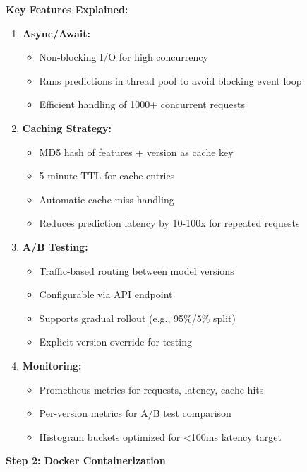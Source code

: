\textbf{Key Features Explained:}

\begin{enumerate}
    \item \textbf{Async/Await:}
    \begin{itemize}
        \item Non-blocking I/O for high concurrency
        \item Runs predictions in thread pool to avoid blocking event loop
        \item Efficient handling of 1000+ concurrent requests
    \end{itemize}

    \item \textbf{Caching Strategy:}
    \begin{itemize}
        \item MD5 hash of features + version as cache key
        \item 5-minute TTL for cache entries
        \item Automatic cache miss handling
        \item Reduces prediction latency by 10-100x for repeated requests
    \end{itemize}

    \item \textbf{A/B Testing:}
    \begin{itemize}
        \item Traffic-based routing between model versions
        \item Configurable via API endpoint
        \item Supports gradual rollout (e.g., 95\%/5\% split)
        \item Explicit version override for testing
    \end{itemize}

    \item \textbf{Monitoring:}
    \begin{itemize}
        \item Prometheus metrics for requests, latency, cache hits
        \item Per-version metrics for A/B test comparison
        \item Histogram buckets optimized for <100ms latency target
    \end{itemize}
\end{enumerate}

\textbf{Step 2: Docker Containerization}

